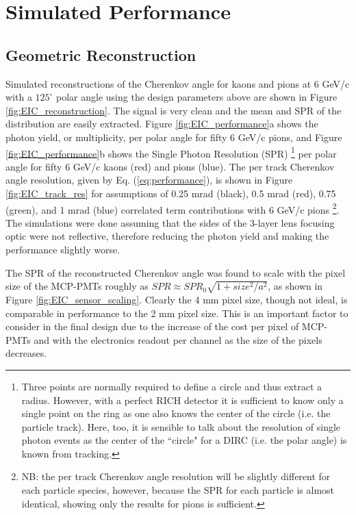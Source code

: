\clearpage
\section{Simulated Performance}

\subsection{Geometric Reconstruction}
Simulated reconstructions of the Cherenkov angle for kaons and pions at 6 GeV/c with a $125^{\circ}$ polar angle using the design parameters above are shown in Figure \ref{fig:EIC_reconstruction}. The signal is very clean and the mean and SPR of the distribution are easily extracted. Figure \ref{fig:EIC_performance}a shows the photon yield, or multiplicity, per polar angle for fifty 6 GeV/c pions, and Figure \ref{fig:EIC_performance}b shows the Single Photon Resolution (SPR) \footnote{Three points are normally required to define a circle and thus extract a radius. However, with a perfect RICH detector it is sufficient to know only a single point on the ring as one also knows the center of the circle (i.e. the particle track). Here, too, it is sensible to talk about the resolution of single photon events as the center of the ``circle" for a DIRC (i.e. the polar angle) is known from tracking.} per polar angle for fifty 6 GeV/c kaons (red) and pions (blue). The per track Cherenkov angle resolution, given by Eq. (\ref{eq:performance}), is shown in Figure \ref{fig:EIC_track_res} for assumptions of 0.25 mrad (black), 0.5 mrad (red), 0.75 (green), and 1 mrad (blue) correlated term contributions with 6 GeV/c pions \footnote{NB: the per track Cherenkov angle resolution will be slightly different for each particle species, however, because the SPR for each particle is almost identical, showing only the results for pions is sufficient.}.  The simulations were done assuming that the sides of the 3-layer lens focusing optic were not reflective, therefore reducing the photon yield and making the performance slightly worse.

The SPR of the reconstructed Cherenkov angle was found to scale with the pixel size of the MCP-PMTs roughly as $SPR \approx SPR_{0}\sqrt{1+size^2/a^2}$, as shown in Figure \ref{fig:EIC_sensor_scaling}. Clearly the 4 mm pixel size, though not ideal, is comparable in performance to the 2 mm pixel size. This is an important factor to consider in the final design due to the increase of the cost per pixel of MCP-PMTs and with the electronics readout per channel as the size of the pixels decreases.


